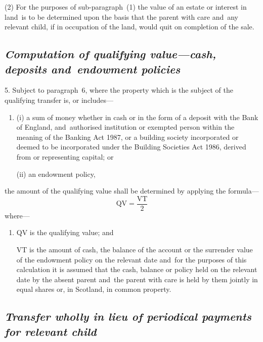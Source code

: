 \documentclass[12pt,a4paper]{article}
\begin{document}
(2) For the purposes of sub-paragraph~(1) the value of an estate or interest in land~is to be determined upon the basis that the parent with care and~any relevant child, if in occupation of the land, would quit on completion of the sale.


\subsection*{\itshape Computation of qualifying value—cash, deposits and~endowment policies}

5.  Subject to paragraph~6, where the property which is the subject of the qualifying transfer is, or includes—
\begin{enumerate}\item[]
(i) a sum of money whether in cash or in the form of a deposit with the Bank of England, and~authorised institution or exempted person within the meaning of the Banking Act 1987, or a building society incorporated or deemed to be incorporated under the Building Societies Act 1986, derived from or representing capital; or

(ii) an endowment policy,
\end{enumerate}
the amount of the qualifying value shall be determined by applying the formula—
\[ \mathrm{QV} = \frac{\mathrm{VT}}{2}\]
where—
\begin{enumerate}\item[]
QV is the qualifying value; and

VT is the amount of cash, the balance of the account or the surrender value of the endowment policy on the relevant date
and~for the purposes of this calculation it is assumed that the cash, balance or policy held on the relevant date by the absent parent and~the parent with care is held by them jointly in equal shares or, in Scotland, in common property.  %
\end{enumerate}


\subsection*{\sloppy\itshape Transfer wholly in lieu of periodical payments for relevant child}
\end{document}
